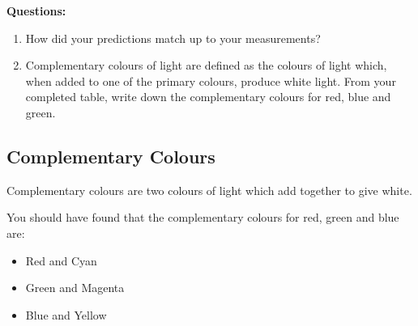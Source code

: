 {\textbf{Questions:}\\
\begin{enumerate}
\item How did your predictions match up to your measurements? 
\item Complementary colours of light are defined as the colours of light which, when added to one of the primary colours, produce white light. From your completed table, write down the complementary colours for red, blue and green.
\end{enumerate}
}

\subsection{Complementary Colours}
Complementary colours are two colours of light which add together to give white. 


You should have found that the complementary colours for red, green and blue are: 
\begin{itemize}
\item{Red and Cyan}
\item{Green and Magenta}
\item{Blue and Yellow}
\end{itemize}



